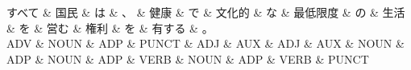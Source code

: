 \documentclass[tikz,border=5pt]{standalone}
\begin{document}
\normalsize
\begin{dependency}[edge unit distance=12.0pt]
    \begin{deptext}[column sep=1em]
        すべて \& 国民 \& は \& 、 \& 健康 \& で \& 文化的 \& な \& 最低限度 \& の \& 生活 \& を \& 営む \& 権利 \& を \& 有する \& 。\\
        ADV \& NOUN \& ADP \& PUNCT \& ADJ \& AUX \& ADJ \& AUX \& NOUN \& ADP \& NOUN \& ADP \& VERB \& NOUN \& ADP \& VERB \& PUNCT\\
    \end{deptext}
\end{dependency}
\end{document}
